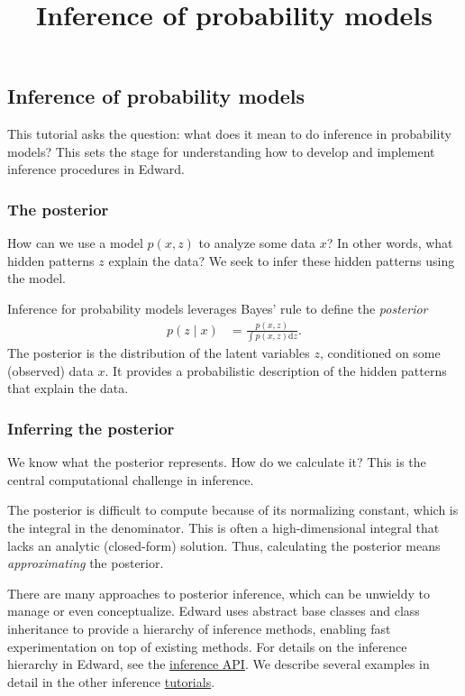 \title{Inference of probability models}

\subsection{Inference of probability models}

This tutorial asks the question: what does it mean to do inference in
probability models? This sets the stage for understanding how to
develop and implement inference procedures in Edward.

\subsubsection{The posterior}

How can we use a model $p(x,z)$ to analyze some data $x$? In other words,
what hidden patterns $z$ explain the data? We seek to infer these
hidden patterns using the model.

Inference for probability models leverages Bayes' rule to define the
\emph{posterior}
\begin{align*}
  p(z \mid x)
  &=
  \frac{p(x,z)}{\int p(x,z) \text{d}z}.
\end{align*}
The posterior is the distribution of the latent variables $z$, conditioned on
some (observed) data $x$. It provides a probabilistic description of the hidden
patterns that explain the data.


\subsubsection{Inferring the posterior}

We know what the posterior represents. How do we calculate it? This is the
central computational challenge in inference.

The posterior is difficult to compute because of its normalizing
constant, which is the integral in the denominator.
This is often a high-dimensional integral that lacks an analytic (closed-form)
solution. Thus, calculating the posterior means \emph{approximating} the
posterior.

There are many approaches to posterior inference, which can be unwieldy to
manage or even conceptualize. Edward uses abstract base classes and class
inheritance to provide a hierarchy of inference methods, enabling fast
experimentation on top of existing methods. For details on the inference
hierarchy in Edward, see the
\href{api/inferences.html}{inference API}. We describe several examples in
detail in the other inference \href{tutorials.html}{tutorials}.
